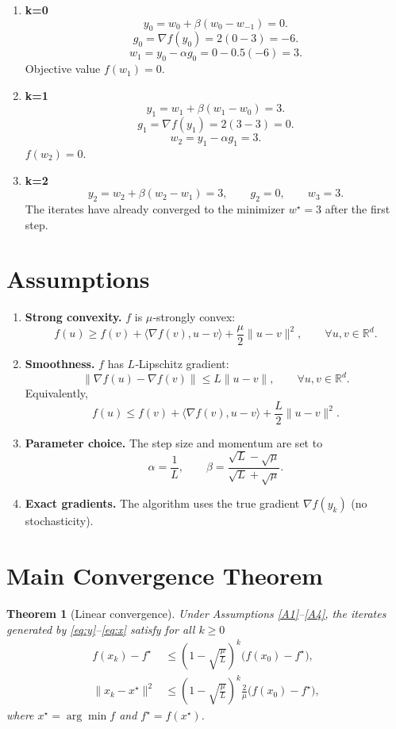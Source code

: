 \documentclass{article}
\newtheorem{theorem}{Theorem}
\newcommand{\grad}{\nabla}
\newcommand{\R}{\mathbb{R}}
\begin{document}
\begin{enumerate}[label=Iteration \arabic*:, leftmargin=*]
\item \textbf{k=0}
\[
y_0 = w_0 + \beta (w_0-w_{-1}) = 0.
\]
\[
g_0 = \grad f(y_0)=2(0-3)=-6.
\]
\[
w_1 = y_0 - \alpha g_0 = 0 - 0.5(-6)=3.
\]
Objective value $f(w_1)=0$.
\item \textbf{k=1}
\[
y_1 = w_1 + \beta (w_1-w_0)=3.
\]
\[
g_1 = \grad f(y_1)=2(3-3)=0.
\]
\[
w_2 = y_1 - \alpha g_1 = 3.
\]
$f(w_2)=0$.
\item \textbf{k=2}
\[
y_2 = w_2 + \beta (w_2-w_1)=3,
\qquad
g_2=0,
\qquad
w_3=3.
\]
The iterates have already converged to the minimizer $w^\star=3$ after the first step.
\end{enumerate}

\newpage
\section*{Assumptions}
\begin{enumerate}[label=\textbf{A\arabic*:}, leftmargin=*]
\item \label{A1} \textbf{Strong convexity.} $f$ is $\mu$‑strongly convex:
\[
f(u)\ge f(v)+\langle\grad f(v),u-v\rangle +\frac{\mu}{2}\|u-v\|^2,\qquad\forall u,v\in\R^d.
\]
\item \label{A2} \textbf{Smoothness.} $f$ has $L$‑Lipschitz gradient:
\[
\|\grad f(u)-\grad f(v)\|\le L\|u-v\|,\qquad\forall u,v\in\R^d.
\]
Equivalently,
\[
f(u)\le f(v)+\langle\grad f(v),u-v\rangle +\frac{L}{2}\|u-v\|^2 .
\]
\item \label{A3} \textbf{Parameter choice.} The step size and momentum are set to
\[
\alpha=\frac{1}{L},\qquad 
\beta =\frac{\sqrt{L}-\sqrt{\mu}}{\sqrt{L}+\sqrt{\mu}}.
\]
\item \label{A4} \textbf{Exact gradients.} The algorithm uses the true gradient $\grad f(y_k)$ (no stochasticity).
\end{enumerate}

\section*{Main Convergence Theorem}
\begin{theorem}[Linear convergence]\label{thm:lin}
Under Assumptions \ref{A1}--\ref{A4}, the iterates generated by \eqref{eq:y}--\eqref{eq:x} satisfy for all $k\ge 0$
\begin{align}
f(x_k)-f^\star &\le \left(1-\sqrt{\frac{\mu}{L}}\right)^k\bigl(f(x_0)-f^\star\bigr),\label{eq:funcrate}\\[4pt]
\|x_k-x^\star\|^2 &\le \left(1-\sqrt{\frac{\mu}{L}}\right)^k\frac{2}{\mu}\bigl(f(x_0)-f^\star\bigr),\label{eq:distancerate}
\end{align}
where $x^\star=\arg\min f$ and $f^\star=f(x^\star)$.
\end{theorem}
\end{document}
